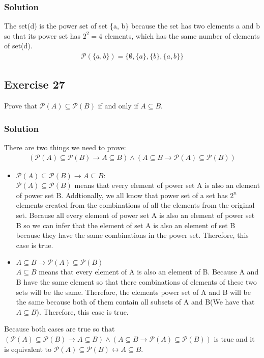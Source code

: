 \documentclass{article}
\theoremstyle{mytheoremstyle}
\theoremstyle{mytheoremstyle}
\theoremstyle{myproblemstyle}
\begin{document}
    \subsubsection*{Solution}
        The set(d) is the power set of set \{a, b\} because the set has two elements a and b
        so that its power set has \(2^2 = 4\) elements, which has the same number of elements
        of set(d). 
        \begin{align*}
            \mathcal{P}(\{a, b\}) = \{\emptyset, \{a\}, \{b\}, \{a, b\}\}
        \end{align*}
    \subsection*{Exercise 27}
        Prove that \(\mathcal{P}(A) \subseteq \mathcal{P}(B)\) if and only if \(A\subseteq B\).
    \subsubsection*{Solution}
        There are two things we need to prove:
        \begin{align*}
            (\mathcal{P}(A) \subseteq \mathcal{P}(B) \to A \subseteq B) \land (A \subseteq B \to \mathcal{P}(A) \subseteq \mathcal{P}(B))
        \end{align*}
        \begin{itemize}
            \item \(\mathcal{P}(A) \subseteq \mathcal{P}(B) \to A \subseteq B\):\\
            
            \(\mathcal{P}(A) \subseteq \mathcal{P}(B)\) means that every element of power set A
            is also an element of power set B. Addtionally, we all know that power set of a set
            has \(2^n\) elements created from the combinations of all the elements from the original
            set. Because all every element of power set A is also an element of power set B so we can infer that
            the element of set A is also an element of set B because they have the same combinations in the power set.
            Therefore, this case is true.
            \item \(A \subseteq B \to \mathcal{P}(A) \subseteq \mathcal{P}(B)\)\\
            
            \(A \subseteq B\) means that every element of A is also an element of B. Because A and B
            have the same element so that there combinations of elements of these two sets will be the same.
            Therefore, the elements power set of A and B will be the same because both of them contain
            all subsets of A and B(We have that \(A \subseteq B\)). Therefore, this case is true.
        \end{itemize}
        Because both cases are true so that \((\mathcal{P}(A) \subseteq \mathcal{P}(B) \to A \subseteq B) \land (A \subseteq B \to \mathcal{P}(A) \subseteq \mathcal{P}(B))\)
        is true and it is equivalent to \(\mathcal{P}(A) \subseteq \mathcal{P}(B) \leftrightarrow A \subseteq B\).
\end{document}
